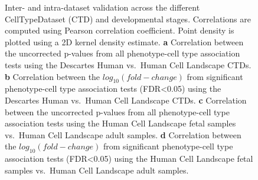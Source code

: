 \documentclass[
]{report}
\begin{document}
\begin{figure}[H]


\caption{\label{fig-ctd-correlationD08295A6-16DC-499D-85A8-8BA656E013A2}Inter-
and intra-dataset validation across the different CellTypeDataset (CTD)
and developmental stages. Correlations are computed using Pearson
correlation coefficient. Point density is plotted using a 2D kernel
density estimate. \textbf{a} Correlation between the uncorrected
p-values from all phenotype-cell type association tests using the
Descartes Human vs.~Human Cell Landscape CTDs. \textbf{b} Correlation
between the \(log_{10}(fold-change)\) from significant phenotype-cell
type association tests (FDR\textless0.05) using the Descartes Human
vs.~Human Cell Landscape CTDs. \textbf{c} Correlation between the
uncorrected p-values from all phenotype-cell type association tests
using the Human Cell Landscape fetal samples vs.~Human Cell Landscape
adult samples. \textbf{d} Correlation between the
\(log_{10}(fold-change)\) from significant phenotype-cell type
association tests (FDR\textless0.05) using the Human Cell Landscape
fetal samples vs.~Human Cell Landscape adult samples.}

\end{figure}%
\end{document}
